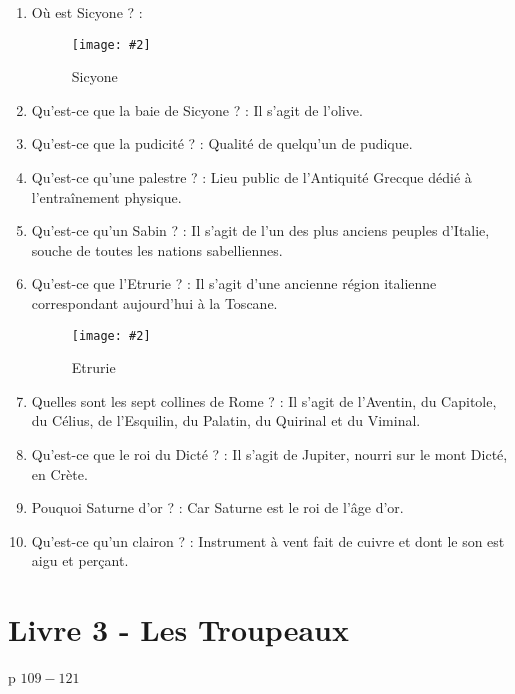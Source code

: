 \documentclass[a4paper, 11pt, hidelinks]{article}
\newcommand{\img}[4]{\begin{figure}[!ht]
    \centering
    \texttt{[image: \#2]}
    \caption{#3}
    \label{#4}
    \end{figure} }
\begin{document}
\begin{enumerate}
      \item Où est Sicyone ? :
            \img{0.25}{Sicyone.png}{Sicyone}{107}
      \item Qu'est-ce que la baie de Sicyone ? : Il s'agit de l'olive.
      \item Qu'est-ce que la pudicité ? : Qualité de quelqu'un de pudique.
      \item Qu'est-ce qu'une palestre ? : Lieu public de l'Antiquité Grecque dédié à l'entraînement physique.
      \item Qu'est-ce qu'un Sabin ? : Il s'agit de l'un des plus anciens peuples d'Italie, souche de toutes les nations sabelliennes.
      \item Qu'est-ce que l'Etrurie ? : Il s'agit d'une ancienne région italienne correspondant aujourd'hui à la Toscane.
            \img{0.5}{Etrurie.png}{Etrurie}{108}
      \item Quelles sont les sept collines de Rome ? : Il s'agit de l'Aventin, du Capitole, du Célius, de l'Esquilin, du Palatin,
            du Quirinal et du Viminal.
      \item Qu'est-ce que le roi du Dicté ? : Il s'agit de Jupiter, nourri sur le mont Dicté, en Crète.
      \item Pouquoi Saturne d'or ? : Car Saturne est le roi de l'âge d'or.
      \item Qu'est-ce qu'un clairon ? : Instrument à vent fait de cuivre et dont le son est aigu et perçant.
\end{enumerate}

\section{Livre 3 - Les Troupeaux}

p $109 - 121$
\end{document}
